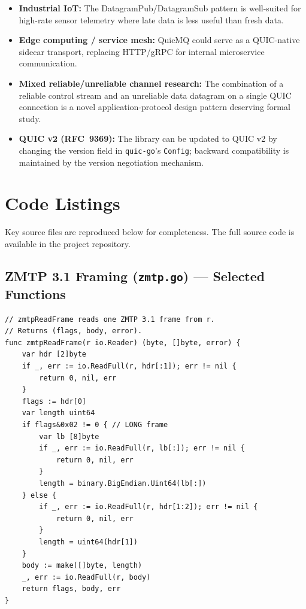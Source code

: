 \documentclass[12pt, a4paper, oneside]{report}
\begin{document}
\begin{itemize}
  \item \textbf{Industrial IoT:} The DatagramPub/DatagramSub pattern is well-suited for high-rate sensor telemetry where late data is less useful than fresh data.
  \item \textbf{Edge computing / service mesh:} QuicMQ could serve as a QUIC-native sidecar transport, replacing HTTP/gRPC for internal microservice communication.
  \item \textbf{Mixed reliable/unreliable channel research:} The combination of a reliable control stream and an unreliable data datagram on a single QUIC connection is a novel application-protocol design pattern deserving formal study.
  \item \textbf{QUIC v2 (RFC~9369):} The library can be updated to QUIC v2 by changing the version field in \texttt{quic-go}'s \texttt{Config}; backward compatibility is maintained by the version negotiation mechanism.
\end{itemize}





\appendix

\chapter{Code Listings}
\label{app:code}

Key source files are reproduced below for completeness. The full source code is available in the project repository.

\section{ZMTP 3.1 Framing (\texttt{zmtp.go}) — Selected Functions}

\begin{lstlisting}[caption={ZMTP~3.1 frame decoder (excerpt from \texttt{zmtp.go}).}]
// zmtpReadFrame reads one ZMTP 3.1 frame from r.
// Returns (flags, body, error).
func zmtpReadFrame(r io.Reader) (byte, []byte, error) {
    var hdr [2]byte
    if _, err := io.ReadFull(r, hdr[:1]); err != nil {
        return 0, nil, err
    }
    flags := hdr[0]
    var length uint64
    if flags&0x02 != 0 { // LONG frame
        var lb [8]byte
        if _, err := io.ReadFull(r, lb[:]); err != nil {
            return 0, nil, err
        }
        length = binary.BigEndian.Uint64(lb[:])
    } else {
        if _, err := io.ReadFull(r, hdr[1:2]); err != nil {
            return 0, nil, err
        }
        length = uint64(hdr[1])
    }
    body := make([]byte, length)
    _, err := io.ReadFull(r, body)
    return flags, body, err
}
\end{lstlisting}
\end{document}
